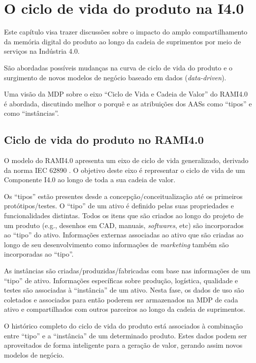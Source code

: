 \chapter{O ciclo de vida do produto na I4.0}
\label{cha:ciclo-de-vida}
	
	Este capítulo visa trazer discussões sobre o impacto do amplo compartilhamento da memória digital do produto ao longo da cadeia de suprimentos por meio de serviços na Indústria 4.0.
	
	São abordadas possíveis mudanças na curva de ciclo de vida do produto e o surgimento de novos modelos de negócio baseado em dados (\textit{data-driven}).
	
	Uma visão da MDP sobre o eixo ``Ciclo de Vida e Cadeia de Valor'' do RAMI4.0 é abordada, discutindo melhor o porquê e as atribuições dos AASs como ``tipos'' e como ``instâncias''.
	

\section{Ciclo de vida do produto no RAMI4.0}
	
	O modelo do RAMI4.0 apresenta um eixo de ciclo de vida generalizado, derivado da norma IEC 62890 \cite{adolphs2015rami}. O objetivo deste eixo é representar o ciclo de vida de um Componente I4.0 ao longo de toda a sua cadeia de valor.
	
	Os ``tipos'' estão presentes desde a concepção/conceitualização até os primeiros protótipos/testes. O ``tipo'' de um ativo é definido pelas suas propriedades e funcionalidades distintas. Todos os itens que são criados ao longo do projeto de um produto (e.g., desenhos em CAD, manuais, \textit{softwares}, etc) são incorporados ao ``tipo'' do ativo. Informações externas associadas ao ativo que são criadas ao longo de seu desenvolvimento como informações de \textit{marketing} também são incorporadas ao ``tipo''.
	
	As instâncias são criadas/produzidas/fabricadas com base nas informações de um ``tipo'' de ativo. Informações específicas sobre produção, logística, qualidade e testes são associadas à ``instância'' de um ativo. Nesta fase, os dados de uso são coletados e associados para então poderem ser armazenados na MDP de cada ativo e compartilhados com outros parceiros ao longo da cadeia de suprimentos. 
	
	O histórico completo do ciclo de vida do produto está associados à combinação entre ``tipo'' e a ``instância'' de um determinado produto. Estes dados podem ser aproveitados de forma inteligente para a geração de valor, gerando assim novos modelos de negócio.
	
